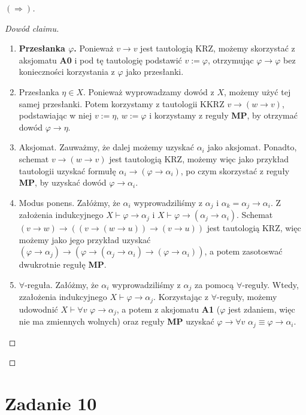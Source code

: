 \begin{proof}[\( (\Rightarrow) \)]
\begin{proof}[Dowód claimu]
    \begin{enumerate}
        \item \textbf{Przesłanka \( \varphi \).} Ponieważ \( v \to v \) jest tautologią KRZ, możemy skorzystać z aksjomatu \textbf{A0} i pod tę tautologię podstawić \(v := \varphi \), otrzymując \( \varphi \to \varphi \) bez konieczności korzystania z \( \varphi \) jako przesłanki.
        \item Przesłanka \( \eta \in X \). Ponieważ wyprowadzamy dowód z \( X \), możemy użyć tej samej przesłanki. Potem korzystamy z tautologii KKRZ \( v \to (w \to v) \), podstawiając w niej \( v := \eta \), \( w := \varphi \) i korzystamy z reguły \textbf{MP}, by otrzymać dowód \( \varphi \to \eta \).
        \item Aksjomat. Zauważmy, że dalej możemy uzyskać \( \alpha_i \) jako aksjomat. Ponadto, schemat \( v \to (w \to v) \) jest tautologią KRZ, możemy więc jako przykład tautologii uzyskać formułę \( \alpha_i \to (\varphi \to \alpha_i) \), po czym skorzystać z reguły \textbf{MP}, by uzyskać dowód \( \varphi \to \alpha_i \).
        \item Modus ponens. Załóżmy, że \( \alpha_i \) wyprowadziliśmy z \( \alpha_j \) i \( \alpha_k = \alpha_j \to \alpha_i \). Z założenia indukcyjnego \( X \vdash \varphi \to \alpha_j \) i \( X \vdash \varphi \to (\alpha_j \to \alpha_i) \). Schemat \( (v \to w) \to ((v \to (w \to u)) \to (v \to u)) \) jest tautologią KRZ, więc możemy jako jego przykład uzyskać \( (\varphi \to \alpha_j) \to (\varphi \to (\alpha_j \to \alpha_i) \to (\varphi \to \alpha_i)) \), a potem zasotoswać dwukrotnie regułę \textbf{MP}.
        \item \( \forall \)-reguła. Załóżmy, że \( \alpha_i \) wyprowadziliśmy z \( \alpha_j \) za pomocą \( \forall \)-reguły. Wtedy, zzałożenia indukcyjnego \( X \vdash \varphi \to \alpha_j \). Korzystając z \( \forall \)-reguły, możemy udowodnić \( X \vdash \forall v\,\,\varphi \to \alpha_j \), a potem z aksjomatu \textbf{A1} (\( \varphi \) jest zdaniem, więc nie ma zmiennych wolnych) oraz reguły \textbf{MP} uzyskać \( \varphi \to \forall v\,\,\alpha_j \equiv \varphi \to \alpha_i \).
    \end{enumerate}
    
\end{proof}

\end{proof}

\section*{Zadanie 10}

